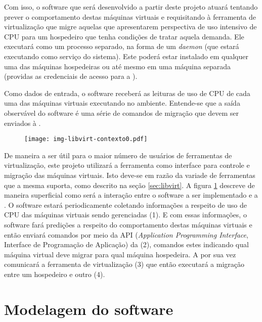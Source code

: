 Com isso, o software que será desenvolvido a partir deste projeto atuará
tentando prever o comportamento destas máquinas virtuais e requisitando à
ferramenta de virtualização que migre aquelas que apresentarem perspectiva
de uso intensivo de CPU para um hospedeiro que tenha condições de tratar
aquela demanda. Ele executará como um processo separado, na forma de um
\emph{daemon} (que estará executando como serviço do sistema). Este poderá
estar instalado em qualquer uma das máquinas hospedeiras ou até mesmo em
uma máquina separada (providas as credenciais de acesso para a \libvirt{}).

Como dados de entrada, o software receberá as leituras de uso de CPU de cada
uma das máquinas virtuais executando no ambiente. Entende-se que a saída
observável do software é uma série de comandos de migração que devem ser
enviados à \libvirt{}.

\begin{figure}[htp]
\centering
\texttt{[image: img-libvirt-contexto0.pdf]}
\label{fig:libvirtcontexto0}
\end{figure}

De maneira a ser útil para o maior número de usuários de ferramentas de
virtualização, este projeto utilizará a ferramenta \libvirt{} como interface
para controle e migração das máquinas virtuais. Isto deve-se em razão da
variade de ferramentas que a mesma suporta, como descrito na seção
\ref{sec:libvirt}. A figura \ref{fig:libvirtcontexto0} descreve de maneira
superficial como será a interação entre o software a ser implementado e a
\libvirt{}. O software estará periodicamente coletando informações a respeito
de uso de CPU das máquinas virtuais sendo gerenciadas (1). E com essas
informações, o software fará predições a respeito do comportamento destas
máquinas virtuais e então enviará comandos por meio da API (\emph{Application
Programming Interface}, Interface de Programação de Aplicação) da \libvirt{}
(2), comandos estes indicando qual máquina virtual deve migrar para qual
máquina hospedeira. A \libvirt{} por sua vez comunicará a ferramenta de
virtualização (3) que então executará a migração entre um hospedeiro e outro
(4).


\section{Modelagem do software}\label{sec:modelagem}


